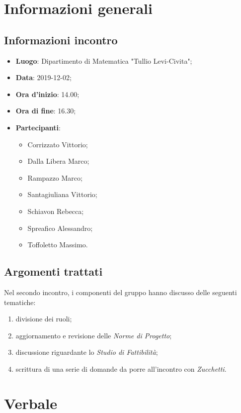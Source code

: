 \section{Informazioni generali}
    \subsection{Informazioni incontro}
        \begin{itemize}
            \item \textbf{Luogo}: Dipartimento di Matematica "Tullio Levi-Civita";
            \item \textbf{Data}: 2019-12-02;
            \item \textbf{Ora d'inizio}: 14.00;
            \item \textbf{Ora di fine}: 16.30;
            \item \textbf{Partecipanti}: \begin{itemize}
                \item Corrizzato Vittorio;
                \item Dalla Libera Marco;
                \item Rampazzo Marco;
                \item Santagiuliana Vittorio;
                \item Schiavon Rebecca;
                \item Spreafico Alessandro;
                \item Toffoletto Massimo.
            \end{itemize}
        \end{itemize}
    \subsection{Argomenti trattati}
        Nel secondo incontro, i componenti del gruppo hanno discusso delle seguenti tematiche:
        \begin{enumerate}
            \item divisione dei ruoli;
            \item aggiornamento e revisione delle \textit{Norme di Progetto};
            \item discussione riguardante lo \textit{Studio di Fattibilità};
            \item scrittura di una serie di domande da porre all'incontro con \textit{Zucchetti}.
        \end{enumerate}
\section{Verbale}
